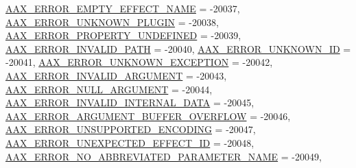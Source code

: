 \begin{DoxyCompactItemize}
\mbox{\hyperlink{a00494_a5f8c7439f3a706c4f8315a9609811937a4fed1b5fbe03c5da6a8131fdf9dc632c}{A\+A\+X\+\_\+\+E\+R\+R\+O\+R\+\_\+\+E\+M\+P\+T\+Y\+\_\+\+E\+F\+F\+E\+C\+T\+\_\+\+N\+A\+ME}} = -\/20037, 
\mbox{\hyperlink{a00494_a5f8c7439f3a706c4f8315a9609811937a82f242cc5fd62a4bf7db13326eee77fb}{A\+A\+X\+\_\+\+E\+R\+R\+O\+R\+\_\+\+U\+N\+K\+N\+O\+W\+N\+\_\+\+P\+L\+U\+G\+IN}} = -\/20038, 
\mbox{\hyperlink{a00494_a5f8c7439f3a706c4f8315a9609811937aa94e856c17c3faf72f62806059e14013}{A\+A\+X\+\_\+\+E\+R\+R\+O\+R\+\_\+\+P\+R\+O\+P\+E\+R\+T\+Y\+\_\+\+U\+N\+D\+E\+F\+I\+N\+ED}} = -\/20039, 
\newline
\mbox{\hyperlink{a00494_a5f8c7439f3a706c4f8315a9609811937a5a9bd9a16c6c92b9ac39e16c3fed5711}{A\+A\+X\+\_\+\+E\+R\+R\+O\+R\+\_\+\+I\+N\+V\+A\+L\+I\+D\+\_\+\+P\+A\+TH}} = -\/20040, 
\mbox{\hyperlink{a00494_a5f8c7439f3a706c4f8315a9609811937ae754797bbf6271fbdc9e42de138dd067}{A\+A\+X\+\_\+\+E\+R\+R\+O\+R\+\_\+\+U\+N\+K\+N\+O\+W\+N\+\_\+\+ID}} = -\/20041, 
\mbox{\hyperlink{a00494_a5f8c7439f3a706c4f8315a9609811937a48a5ec1530ce351b081413c73097928f}{A\+A\+X\+\_\+\+E\+R\+R\+O\+R\+\_\+\+U\+N\+K\+N\+O\+W\+N\+\_\+\+E\+X\+C\+E\+P\+T\+I\+ON}} = -\/20042, 
\mbox{\hyperlink{a00494_a5f8c7439f3a706c4f8315a9609811937a7d27a3bd88231e331c98d85f5b10e2eb}{A\+A\+X\+\_\+\+E\+R\+R\+O\+R\+\_\+\+I\+N\+V\+A\+L\+I\+D\+\_\+\+A\+R\+G\+U\+M\+E\+NT}} = -\/20043, 
\newline
\mbox{\hyperlink{a00494_a5f8c7439f3a706c4f8315a9609811937aa77cf0ad2d545c97b095d8bc19a7c969}{A\+A\+X\+\_\+\+E\+R\+R\+O\+R\+\_\+\+N\+U\+L\+L\+\_\+\+A\+R\+G\+U\+M\+E\+NT}} = -\/20044, 
\mbox{\hyperlink{a00494_a5f8c7439f3a706c4f8315a9609811937af004b994cae4158400c2ff36e1a12004}{A\+A\+X\+\_\+\+E\+R\+R\+O\+R\+\_\+\+I\+N\+V\+A\+L\+I\+D\+\_\+\+I\+N\+T\+E\+R\+N\+A\+L\+\_\+\+D\+A\+TA}} = -\/20045, 
\mbox{\hyperlink{a00494_a5f8c7439f3a706c4f8315a9609811937af9fc41c647e2c9959ed6ebb45191be52}{A\+A\+X\+\_\+\+E\+R\+R\+O\+R\+\_\+\+A\+R\+G\+U\+M\+E\+N\+T\+\_\+\+B\+U\+F\+F\+E\+R\+\_\+\+O\+V\+E\+R\+F\+L\+OW}} = -\/20046, 
\mbox{\hyperlink{a00494_a5f8c7439f3a706c4f8315a9609811937a17a1fd40c029a9337ede3bad778eab3b}{A\+A\+X\+\_\+\+E\+R\+R\+O\+R\+\_\+\+U\+N\+S\+U\+P\+P\+O\+R\+T\+E\+D\+\_\+\+E\+N\+C\+O\+D\+I\+NG}} = -\/20047, 
\newline
\mbox{\hyperlink{a00494_a5f8c7439f3a706c4f8315a9609811937a81bfb2ecc085f4be343d78aea4b1116d}{A\+A\+X\+\_\+\+E\+R\+R\+O\+R\+\_\+\+U\+N\+E\+X\+P\+E\+C\+T\+E\+D\+\_\+\+E\+F\+F\+E\+C\+T\+\_\+\+ID}} = -\/20048, 
\mbox{\hyperlink{a00494_a5f8c7439f3a706c4f8315a9609811937ab7383b0169f6dfa5f86b1fefd6c58ae2}{A\+A\+X\+\_\+\+E\+R\+R\+O\+R\+\_\+\+N\+O\+\_\+\+A\+B\+B\+R\+E\+V\+I\+A\+T\+E\+D\+\_\+\+P\+A\+R\+A\+M\+E\+T\+E\+R\+\_\+\+N\+A\+ME}} = -\/20049, 

\end{DoxyCompactItemize}
